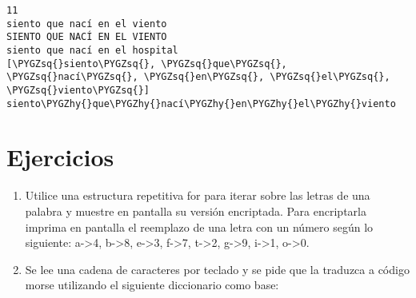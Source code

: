\documentclass[a4paper,12pt,spanish]{sphinxmanual}
\def\PYGZhy{\char`\-}
\def\PYGZsq{\char`\'}
\renewcommand\PYGZsq{\textquotesingle}
\begin{document}
\begin{Verbatim}[commandchars=\\\{\}]
11
siento que nací en el viento
SIENTO QUE NACÍ EN EL VIENTO
siento que nací en el hospital
[\PYGZsq{}siento\PYGZsq{}, \PYGZsq{}que\PYGZsq{}, \PYGZsq{}nací\PYGZsq{}, \PYGZsq{}en\PYGZsq{}, \PYGZsq{}el\PYGZsq{}, \PYGZsq{}viento\PYGZsq{}]
siento\PYGZhy{}que\PYGZhy{}nací\PYGZhy{}en\PYGZhy{}el\PYGZhy{}viento
\end{Verbatim}


\chapter{Ejercicios}
\label{Unidad03-ejercicios:ejercicios}\label{Unidad03-ejercicios::doc}\begin{enumerate}
\item {} 
Utilice una estructura repetitiva for para iterar sobre las letras de
una palabra y muestre en pantalla su versión encriptada. Para
encriptarla imprima en pantalla el reemplazo de una letra con un
número según lo siguiente: a-\textgreater{}4, b-\textgreater{}8, e-\textgreater{}3, f-\textgreater{}7, t-\textgreater{}2, g-\textgreater{}9, i-\textgreater{}1,
o-\textgreater{}0.

\item {} 
Se lee una cadena de caracteres por teclado y se pide que la traduzca
a código morse utilizando el siguiente diccionario como base:

\end{enumerate}
\end{document}
